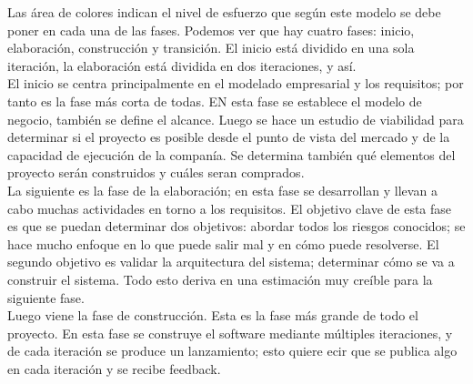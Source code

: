 Las área de colores indican el nivel de esfuerzo que según este modelo se debe poner en cada una de las fases. Podemos ver que hay cuatro fases: inicio, elaboración, construcción y transición. El inicio está dividido en una sola iteración, la elaboración está dividida en dos iteraciones, y así.\\
El inicio se centra principalmente en el modelado empresarial y los requisitos; por tanto es la fase más corta de todas. EN esta fase se establece el modelo de negocio, también se define el alcance. Luego se hace un estudio de viabilidad para determinar si el proyecto es posible desde el punto de vista del mercado y de la capacidad de ejecución de la companía. Se determina también qué elementos del proyecto serán construidos y cuáles seran comprados. \\
La siguiente es la fase de la elaboración; en esta fase se desarrollan y llevan a cabo muchas actividades en torno a los requisitos. El objetivo clave de esta fase es que se puedan determinar dos objetivos: abordar todos los riesgos conocidos; se hace mucho enfoque en lo que puede salir mal y en cómo puede resolverse. El segundo objetivo es validar la arquitectura del sistema; determinar cómo se va a construir el sistema. Todo esto deriva en una estimación muy creíble para la siguiente fase. \\
Luego viene la fase de construcción. Esta es la fase más grande de todo el proyecto. En esta fase se construye el software mediante múltiples iteraciones, y de cada iteración se produce un lanzamiento; esto quiere ecir que se publica algo en cada iteración y se recibe feedback. 